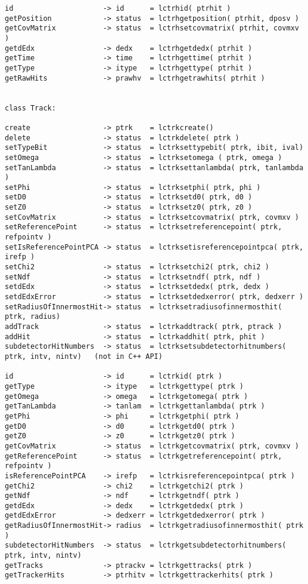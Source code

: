 \begin{scriptsize}
\begin{verbatim}
id                     -> id      = lctrhid( ptrhit )
getPosition            -> status  = lctrhgetposition( ptrhit, dposv )
getCovMatrix           -> status  = lctrhsetcovmatrix( ptrhit, covmxv )
getdEdx                -> dedx    = lctrhgetdedx( ptrhit )
getTime                -> time    = lctrhgettime( ptrhit )
getType                -> itype   = lctrhgettype( ptrhit )
getRawHits             -> prawhv  = lctrhgetrawhits( ptrhit )


class Track:

create                 -> ptrk    = lctrkcreate()
delete                 -> status  = lctrkdelete( ptrk )
setTypeBit             -> status  = lctrksettypebit( ptrk, ibit, ival)
setOmega               -> status  = lctrksetomega ( ptrk, omega )
setTanLambda           -> status  = lctrksettanlambda( ptrk, tanlambda )
setPhi                 -> status  = lctrksetphi( ptrk, phi )
setD0                  -> status  = lctrksetd0( ptrk, d0 )
setZ0                  -> status  = lctrksetz0( ptrk, z0 )
setCovMatrix           -> status  = lctrksetcovmatrix( ptrk, covmxv )
setReferencePoint      -> status  = lctrksetreferencepoint( ptrk, refpointv )
setIsReferencePointPCA -> status  = lctrksetisreferencepointpca( ptrk, irefp )
setChi2                -> status  = lctrksetchi2( ptrk, chi2 )
setNdf                 -> status  = lctrksetndf( ptrk, ndf )
setdEdx                -> status  = lctrksetdedx( ptrk, dedx )
setdEdxError           -> status  = lctrksetdedxerror( ptrk, dedxerr )
setRadiusOfInnermostHit-> status  = lctrksetradiusofinnermosthit( ptrk, radius)
addTrack               -> status  = lctrkaddtrack( ptrk, ptrack )
addHit                 -> status  = lctrkaddhit( ptrk, phit )
subdetectorHitNumbers  -> status  = lctrksetsubdetectorhitnumbers( ptrk, intv, nintv)   (not in C++ API)

id                     -> id      = lctrkid( ptrk )
getType                -> itype   = lctrkgettype( ptrk )
getOmega               -> omega   = lctrkgetomega( ptrk )
getTanLambda           -> tanlam  = lctrkgettanlambda( ptrk )
getPhi                 -> phi     = lctrkgetphi( ptrk )
getD0                  -> d0      = lctrkgetd0( ptrk )
getZ0                  -> z0      = lctrkgetz0( ptrk )
getCovMatrix           -> status  = lctrkgetcovmatrix( ptrk, covmxv )
getReferencePoint      -> status  = lctrkgetreferencepoint( ptrk, refpointv )
isReferencePointPCA    -> irefp   = lctrkisreferencepointpca( ptrk )
getChi2                -> chi2    = lctrkgetchi2( ptrk )
getNdf                 -> ndf     = lctrkgetndf( ptrk )
getdEdx                -> dedx    = lctrkgetdedx( ptrk )
getdEdxError           -> dedxerr = lctrkgetdedxerror( ptrk )
getRadiusOfInnermostHit-> radius  = lctrkgetradiusofinnermosthit( ptrk )
subdetectorHitNumbers  -> status  = lctrkgetsubdetectorhitnumbers( ptrk, intv, nintv)
getTracks              -> ptrackv = lctrkgettracks( ptrk )
getTrackerHits         -> ptrhitv = lctrkgettrackerhits( ptrk )



\end{verbatim}
\end{scriptsize}
